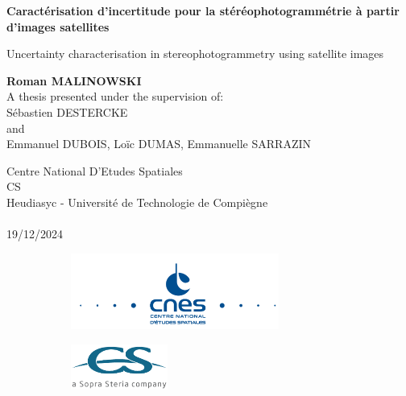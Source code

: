 \begin{titlepage}
    \begin{center}
        \vspace*{1cm}
            
        \Huge
        \textbf{Caractérisation d'incertitude pour la stéréophotogrammétrie à partir d'images satellites}
            
        \vspace{0.5cm}
        \LARGE
        Uncertainty characterisation in stereophotogrammetry using satellite images 

        \vspace{1.5cm}
        \large
        \textbf{Roman MALINOWSKI}\\
        \vspace{0.8cm}
        A thesis presented under the supervision of:\\
        Sébastien DESTERCKE\\
        and\\
        Emmanuel DUBOIS, Loïc DUMAS, Emmanuelle SARRAZIN
       
        \vfill
                
        Centre National D'Etudes Spatiales\\
        CS\\
        Heudiasyc - Université de Technologie de Compiègne\\
        ~\\
        19/12/2024
        \
        \begin{figure}[hb]
            \begin{subfigure}[b]{0.3\linewidth}
                \centering
                \includegraphics[height=2.5cm]{Images/General/Logo_CNES.png}
            \end{subfigure}\hfill
            \begin{subfigure}[b]{0.3\linewidth}
                \centering
                \includegraphics[height=1.5cm]{Images/General/Logo_CS.png}
            \end{subfigure}
        \end{figure}


\end{center}
\end{titlepage}
